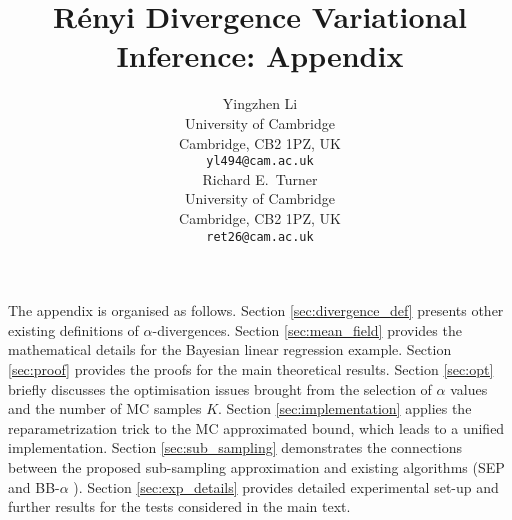 \documentclass{article}
\title{R{\'e}nyi Divergence Variational Inference: Appendix}
\author{
  Yingzhen Li \\
  University of Cambridge\\
  Cambridge, CB2 1PZ, UK \\
  \texttt{yl494@cam.ac.uk} \\
  \And
  Richard E.~Turner \\
  University of Cambridge\\
  Cambridge, CB2 1PZ, UK \\
  \texttt{ret26@cam.ac.uk} \\
}
\begin{document}

\maketitle

The appendix is organised as follows. Section \ref{sec:divergence_def} presents other existing definitions of $\alpha$-divergences. Section \ref{sec:mean_field} provides the mathematical details for the Bayesian linear regression example. Section \ref{sec:proof} provides the proofs for the main theoretical results. Section \ref{sec:opt} briefly discusses the optimisation issues brought from the selection of $\alpha$ values and the number of MC samples $K$. Section \ref{sec:implementation} applies the reparametrization trick to the MC approximated bound, which leads to a unified implementation. Section \ref{sec:sub_sampling} demonstrates the connections between the proposed sub-sampling approximation and existing algorithms (SEP \cite{li:sep} and BB-$\alpha$ \cite{hernandez-lobato:bb-alpha}). Section \ref{sec:exp_details} provides detailed experimental set-up and further results for the tests considered in the main text.

\appendix














\clearpage

\small

\end{document}
